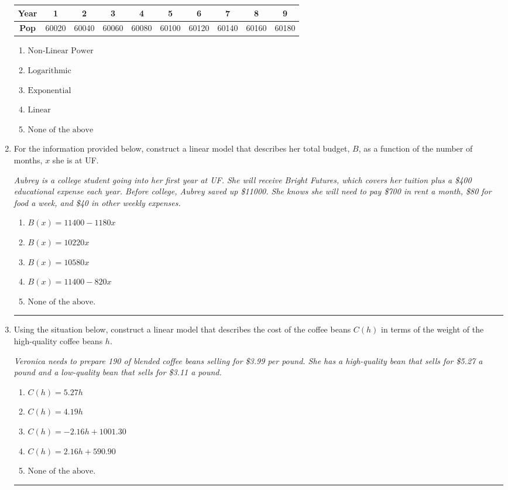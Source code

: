 \documentclass[14pt]{extbook}
\newcommand{\litem}[1]{\item#1\hspace*{-1cm}\rule{\textwidth}{0.4pt}}
\begin{document}
\begin{enumerate}
{\begin{tabular}{c|c|c|c|c|c|c|c|c|c}
\textbf{Year} &1 &2 &3 &4 &5 &6 &7 &8 &9\tabularnewline \hline
\textbf{Pop} &60020 &60040 &60060 &60080 &60100 &60120 &60140 &60160 &60180\end{tabular}\begin{enumerate}[label=\Alph*.]
\item \( \text{Non-Linear Power} \)
\item \( \text{Logarithmic} \)
\item \( \text{Exponential} \)
\item \( \text{Linear} \)
\item \( \text{None of the above} \)

\end{enumerate} }
\litem{
For the information provided below, construct a linear model that describes her total budget, $B$, as a function of the number of months, $x$ she is at UF.
\begin{center}
    \textit{ Aubrey is a college student going into her first year at UF. She will receive Bright Futures, which covers her tuition plus a \$400 educational expense each year. Before college, Aubrey saved up \$11000. She knows she will need to pay \$700 in rent a month, \$80 for food a week, and \$40 in other weekly expenses. }
\end{center}
\begin{enumerate}[label=\Alph*.]
\item \( B(x) = 11400 - 1180 x \)
\item \( B(x) = 10220 x \)
\item \( B(x) = 10580 x \)
\item \( B(x) = 11400 - 820 x \)
\item \( \text{None of the above.} \)

\end{enumerate} }
\litem{
Using the situation below, construct a linear model that describes the cost of the coffee beans $C(h)$ in terms of the weight of the high-quality coffee beans $h$.
\begin{center}
    \textit{ Veronica needs to prepare 190 of blended coffee beans selling for \$3.99 per pound. She has a high-quality bean that sells for \$5.27 a pound and a low-quality bean that sells for \$3.11 a pound. }
\end{center}
\begin{enumerate}[label=\Alph*.]
\item \( C(h) = 5.27 h \)
\item \( C(h) = 4.19 h \)
\item \( C(h) = -2.16 h + 1001.30 \)
\item \( C(h) = 2.16 h + 590.90 \)
\item \( \text{None of the above.} \)


\end{enumerate}}
\end{enumerate}
\end{document}
